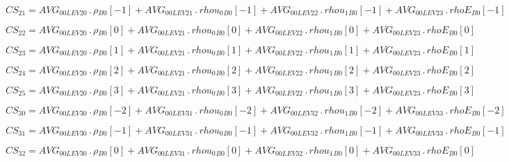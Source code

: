 \documentclass{article}
\begin{document}
\begin{dmath}CS_{21} = AVG_{0 0 LEV 20} \,.\, {\rho{_{B0}}}[{-1}] + AVG_{0 0 LEV 21} \,.\, {rhou_{0}{_{B0}}}[{-1}] + AVG_{0 0 LEV 22} \,.\, {rhou_{1}{_{B0}}}[{-1}] + AVG_{0 0 LEV 23} \,.\, {rhoE{_{B0}}}[{-1}]\end{dmath}

\begin{dmath}CS_{22} = AVG_{0 0 LEV 20} \,.\, {\rho{_{B0}}}[{0}] + AVG_{0 0 LEV 21} \,.\, {rhou_{0}{_{B0}}}[{0}] + AVG_{0 0 LEV 22} \,.\, {rhou_{1}{_{B0}}}[{0}] + AVG_{0 0 LEV 23} \,.\, {rhoE{_{B0}}}[{0}]\end{dmath}

\begin{dmath}CS_{23} = AVG_{0 0 LEV 20} \,.\, {\rho{_{B0}}}[{1}] + AVG_{0 0 LEV 21} \,.\, {rhou_{0}{_{B0}}}[{1}] + AVG_{0 0 LEV 22} \,.\, {rhou_{1}{_{B0}}}[{1}] + AVG_{0 0 LEV 23} \,.\, {rhoE{_{B0}}}[{1}]\end{dmath}

\begin{dmath}CS_{24} = AVG_{0 0 LEV 20} \,.\, {\rho{_{B0}}}[{2}] + AVG_{0 0 LEV 21} \,.\, {rhou_{0}{_{B0}}}[{2}] + AVG_{0 0 LEV 22} \,.\, {rhou_{1}{_{B0}}}[{2}] + AVG_{0 0 LEV 23} \,.\, {rhoE{_{B0}}}[{2}]\end{dmath}

\begin{dmath}CS_{25} = AVG_{0 0 LEV 20} \,.\, {\rho{_{B0}}}[{3}] + AVG_{0 0 LEV 21} \,.\, {rhou_{0}{_{B0}}}[{3}] + AVG_{0 0 LEV 22} \,.\, {rhou_{1}{_{B0}}}[{3}] + AVG_{0 0 LEV 23} \,.\, {rhoE{_{B0}}}[{3}]\end{dmath}

\begin{dmath}CS_{30} = AVG_{0 0 LEV 30} \,.\, {\rho{_{B0}}}[{-2}] + AVG_{0 0 LEV 31} \,.\, {rhou_{0}{_{B0}}}[{-2}] + AVG_{0 0 LEV 32} \,.\, {rhou_{1}{_{B0}}}[{-2}] + AVG_{0 0 LEV 33} \,.\, {rhoE{_{B0}}}[{-2}]\end{dmath}

\begin{dmath}CS_{31} = AVG_{0 0 LEV 30} \,.\, {\rho{_{B0}}}[{-1}] + AVG_{0 0 LEV 31} \,.\, {rhou_{0}{_{B0}}}[{-1}] + AVG_{0 0 LEV 32} \,.\, {rhou_{1}{_{B0}}}[{-1}] + AVG_{0 0 LEV 33} \,.\, {rhoE{_{B0}}}[{-1}]\end{dmath}

\begin{dmath}CS_{32} = AVG_{0 0 LEV 30} \,.\, {\rho{_{B0}}}[{0}] + AVG_{0 0 LEV 31} \,.\, {rhou_{0}{_{B0}}}[{0}] + AVG_{0 0 LEV 32} \,.\, {rhou_{1}{_{B0}}}[{0}] + AVG_{0 0 LEV 33} \,.\, {rhoE{_{B0}}}[{0}]\end{dmath}
\end{document}
